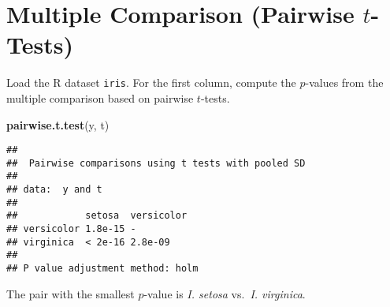 \documentclass[
]{book}
\newenvironment{Shaded}{\begin{snugshade}}{\end{snugshade}}
\newcommand{\KeywordTok}[1]{\textcolor[rgb]{0.13,0.29,0.53}{\textbf{#1}}}
\newcommand{\NormalTok}[1]{#1}
\begin{document}
\hypertarget{multiple-comparison-pairwise-t-tests}{%
\section{\texorpdfstring{Multiple Comparison (Pairwise \(t\)-Tests)}{Multiple Comparison (Pairwise t-Tests)}}\label{multiple-comparison-pairwise-t-tests}}

Load the R dataset \texttt{iris}.
For the first column, compute the \(p\)-values from the multiple comparison based on
pairwise \(t\)-tests.

\begin{Shaded}
\begin{Highlighting}[]
\KeywordTok{pairwise.t.test}\NormalTok{(y, t)}
\end{Highlighting}
\end{Shaded}

\begin{verbatim}
## 
##  Pairwise comparisons using t tests with pooled SD 
## 
## data:  y and t 
## 
##            setosa  versicolor
## versicolor 1.8e-15 -         
## virginica  < 2e-16 2.8e-09   
## 
## P value adjustment method: holm
\end{verbatim}

The pair with the smallest \(p\)-value is \emph{I. setosa} vs.~\emph{I. virginica}.

  
\end{document}
